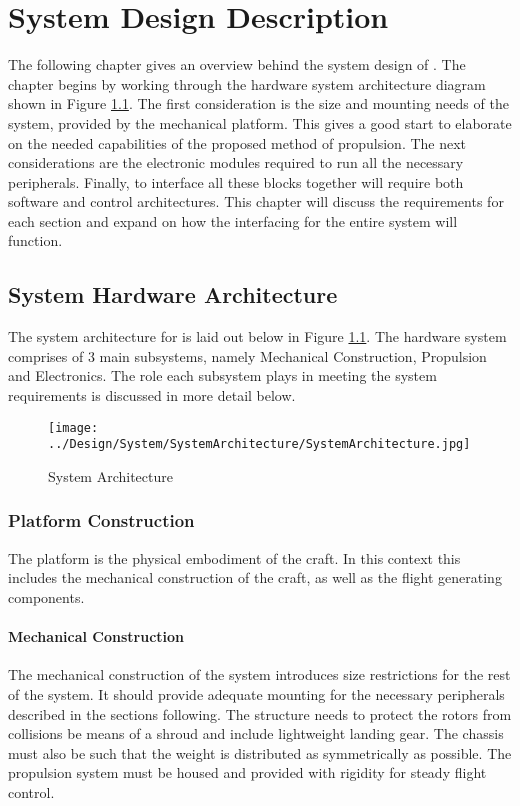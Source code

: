\chapter{System Design Description}
The following chapter gives an overview behind the system design of \projectName. The chapter begins by working through the hardware system architecture diagram shown in Figure \ref{IM_SystemArchitecture}. The first consideration is the size and mounting needs of the system, provided by the mechanical platform. This gives a good start to elaborate on the needed capabilities of the proposed method of propulsion. The next considerations are the electronic modules required to run all the necessary peripherals. Finally, to interface all these blocks together will require both software and control architectures. This chapter will discuss the requirements for each section and expand on how the interfacing for the entire system will function.

	\section{System Hardware Architecture}
	The system architecture for \projectName is laid out below in Figure \ref{IM_SystemArchitecture}. The hardware system comprises of 3 main subsystems, namely Mechanical Construction, Propulsion and Electronics. The role each subsystem plays in meeting the system requirements is discussed in more detail below.
	
	\begin{figure}[H]
		\centering
		\texttt{[image: ../Design/System/SystemArchitecture/SystemArchitecture.jpg]}
		\caption{System Architecture}
		\label{IM_SystemArchitecture}
	\end{figure}
		
		\subsection{Platform Construction}
		The platform is the physical embodiment of the craft. In this context this includes the mechanical construction of the craft, as well as the flight generating components.
		
			\subsubsection{Mechanical Construction}
			The mechanical construction of the system introduces size restrictions for the rest of the system. It should provide adequate mounting for the necessary peripherals described in the sections following. The structure needs to protect the rotors from collisions be means of a shroud and include lightweight landing gear. The chassis must also be such that the weight is distributed as symmetrically as possible. The propulsion system must be housed and provided with rigidity for steady flight control.


